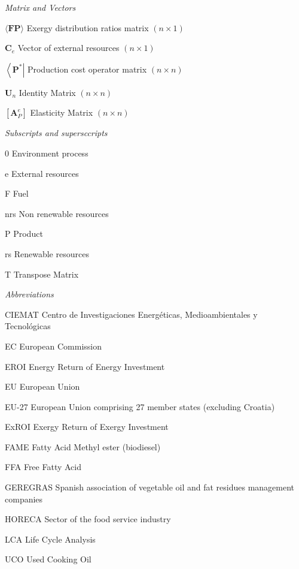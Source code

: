 \documentclass[sustainability,article,accept,moreauthors,pdftex,12pt,a4paper]{mdpi}
\newcommand{\mopcr}[1]{\ensuremath{\left\langle {\textbf{#1}^\ast } \right|}}
\newcommand{\mbr}[1]{\ensuremath{\langle \textbf{#1} \rangle}}
\newcommand{\vm}[1]{\ensuremath{\mathbf{#1}}}
\newcommand{\elm}{\ensuremath{\left[\vm{A}_P^e\right]}}
\begin{document}
\noindent\emph{Matrix and Vectors}
\begin{list}{}{
\renewcommand*{\makelabel}[1]{\hspace{\labelsep}\raggedleft #1} 
 \setlength{\labelwidth}{3em}
 \setlength{\leftmargin}{\labelwidth}
 \setlength{\parsep}{0pt}
 \setlength{\itemsep}{0pt}
 \sloppy}
 \item[\mbr{FP}] Exergy distribution ratios matrix $(n \times 1)$
 \item[$\vm{C}_e$] Vector of external resources $(n \times 1)$
 \item[\mopcr{P}] Production cost operator matrix $(n \times n)$
 \item[$\vm{U}_n$] Identity Matrix $(n \times n)$
 \item[\elm] Elasticity Matrix $(n \times n)$
\end{list}

\noindent\emph{Subscripts and supersccripts}
\begin{list}{}{
 \renewcommand*{\makelabel}[1]{\hspace{\labelsep}\raggedleft #1} 
 \setlength{\labelwidth}{3em}
 \setlength{\leftmargin}{\labelwidth}
 \setlength{\parsep}{0pt}
 \setlength{\itemsep}{0pt}
 \sloppy}
 \item[0] Environment process
 \item[e] External resources
 \item[F] Fuel
 \item[nrs] Non renewable resources
 \item[P] Product
 \item[rs] Renewable resources
 \item[T] Transpose Matrix
\end{list}

\noindent\emph{Abbreviations}
\begin{list}{}{
	\renewcommand*{\makelabel}[1]{\hspace{\labelsep}\raggedleft #1}
 \setlength{\labelwidth}{6em}
 \setlength{\leftmargin}{\labelwidth}
 \setlength{\parsep}{0pt}
 \setlength{\itemsep}{0pt}
 \sloppy}
 \item[CIEMAT] Centro de Investigaciones Energ\'eticas, Medioambientales y Tecnol\'ogicas
 \item[EC] European Commission
 \item[EROI] Energy Return of Energy Investment
 \item[EU] European Union
 \item[EU-27] European Union comprising 27 member states (excluding Croatia)
 \item[ExROI] Exergy Return of Exergy Investment
 \item[FAME] Fatty Acid Methyl ester (biodiesel)
 \item[FFA] Free Fatty Acid
 \item[GEREGRAS] Spanish association of vegetable oil and fat residues management companies
 \item[HORECA] Sector of the food service industry
 \item[LCA] Life Cycle Analysis
 \item[UCO] Used Cooking Oil
\end{list}
\end{document}
